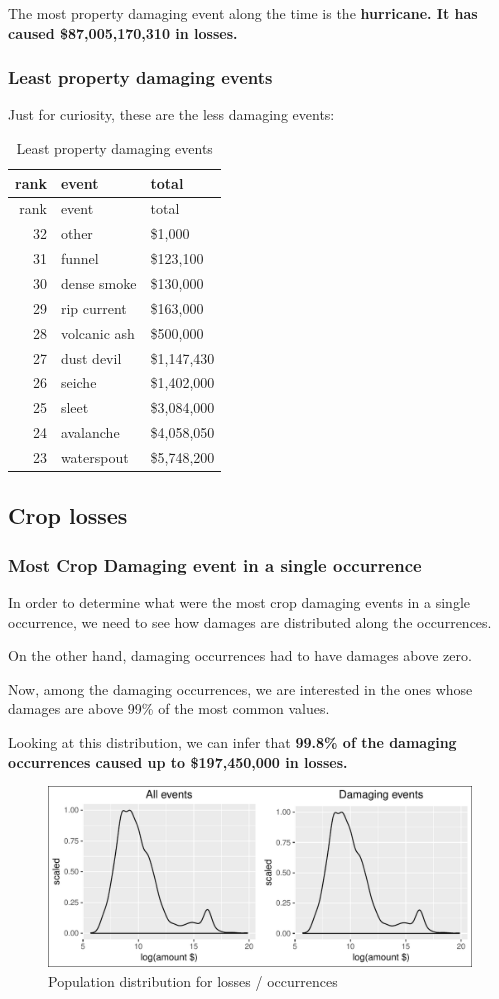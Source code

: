\documentclass[]{article}
\begin{document}
The most property damaging event along the time is the
\textbf{hurricane. It has caused \$87,005,170,310 in losses.}

\subsubsection{Least property damaging
events}\label{least-property-damaging-events}

Just for curiosity, these are the less damaging events:

\begin{longtable}[]{@{}rll@{}}
\caption{Least property damaging events}\tabularnewline
\toprule
rank & event & total\tabularnewline
\midrule
\endfirsthead
\toprule
rank & event & total\tabularnewline
\midrule
\endhead
32 & other & \$1,000\tabularnewline
31 & funnel & \$123,100\tabularnewline
30 & dense smoke & \$130,000\tabularnewline
29 & rip current & \$163,000\tabularnewline
28 & volcanic ash & \$500,000\tabularnewline
27 & dust devil & \$1,147,430\tabularnewline
26 & seiche & \$1,402,000\tabularnewline
25 & sleet & \$3,084,000\tabularnewline
24 & avalanche & \$4,058,050\tabularnewline
23 & waterspout & \$5,748,200\tabularnewline
\bottomrule
\end{longtable}

\subsection{Crop losses}\label{crop-losses}

\subsubsection{Most Crop Damaging event in a single
occurrence}\label{most-crop-damaging-event-in-a-single-occurrence}

In order to determine what were the most crop damaging events in a
single occurrence, we need to see how damages are distributed along the
occurrences.

On the other hand, damaging occurrences had to have damages above zero.

Now, among the damaging occurrences, we are interested in the ones whose
damages are above 99\% of the most common values.

Looking at this distribution, we can infer that \textbf{99.8\% of the
damaging occurrences caused up to \$197,450,000 in losses.}

\begin{figure}[htbp]
\centering
\includegraphics{readme_files/figure-latex/crop-distr-4-1.pdf}
\caption{Population distribution for losses / occurrences}
\end{figure}
\end{document}
